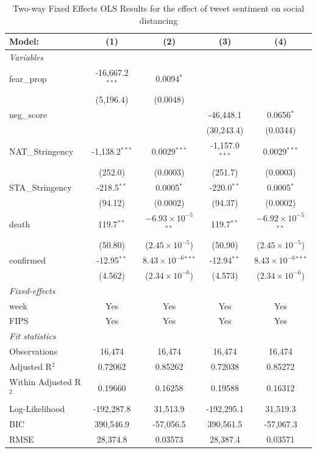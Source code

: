 \documentclass{article}
\newcommand{\ra}[1]{\renewcommand{\arraystretch}{#1}}
\begin{document}
\begin{singlespace}
\centering
\begin{table}[!htb]
\caption{Two-way Fixed Effects OLS Results for the effect of tweet sentiment on social distancing}
\label{tab:mainspec}
\ra{0.6}
\begin{tabular}{lcccc}
  \tabularnewline\midrule\midrule
  Model:&(1) & (2) & (3) & (4)\\
  \midrule \emph{Variables}&   &   &   &  \\
  fear\_prop&-16,667.2$^{***}$ & 0.0094$^{*}$ &    &   \\
    &(5,196.4) & (0.0048) &    &   \\
  neg\_score&   &    & -46,448.1 & 0.0656$^{*}$\\
    &   &    & (30,243.4) & (0.0344)\\
  NAT\_Stringency&-1,138.2$^{***}$ & 0.0029$^{***}$ & -1,157.0$^{***}$ & 0.0029$^{***}$\\
    &(252.0) & (0.0003) & (251.7) & (0.0003)\\
  STA\_Stringency&-218.5$^{**}$ & 0.0005$^{*}$ & -220.0$^{**}$ & 0.0005$^{*}$\\
    &(94.12) & (0.0002) & (94.37) & (0.0002)\\
  death&119.7$^{**}$ & $-6.93\times 10^{-5}$$^{**}$ & 119.7$^{**}$ & $-6.92\times 10^{-5}$$^{**}$\\
    &(50.80) & ($2.45\times 10^{-5}$) & (50.90) & ($2.45\times 10^{-5}$)\\
  confirmed&-12.95$^{**}$ & $8.43\times 10^{-6}$$^{***}$ & -12.94$^{**}$ & $8.43\times 10^{-6}$$^{***}$\\
    &(4.562) & ($2.34\times 10^{-6}$) & (4.573) & ($2.34\times 10^{-6}$)\\
  \midrule \emph{Fixed-effects}&   &   &   &  \\
  week & Yes & Yes & Yes & Yes\\
  FIPS & Yes & Yes & Yes & Yes\\
  \midrule \emph{Fit statistics}&  & & & \\
  Observations & 16,474&16,474&16,474&16,474\\
  Adjusted R$^2$ & 0.72062&0.85262&0.72038&0.85272\\
Within Adjusted R$^2$ & 0.19660&0.16258&0.19588&0.16312\\
  Log-Likelihood & -192,287.8&31,513.9&-192,295.1&31,519.3\\
  BIC & 390,546.9&-57,056.5&390,561.5&-57,067.3\\
  RMSE & 28,374.8&0.03573&28,387.4&0.03571\\

\end{tabular}
\end{table}
\end{singlespace}
\end{document}
